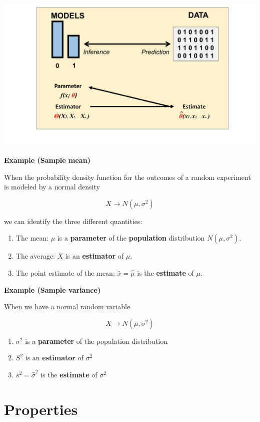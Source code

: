\documentclass[
]{book}
\providecommand{\tightlist}{%
  \setlength{\itemsep}{0pt}\setlength{\parskip}{0pt}}
\begin{document}
\includegraphics{./figures/estimator.JPG}

\textbf{Example (Sample mean)}

When the probability density function for the outcomes of a random experiment is modeled by a normal density

\[X \rightarrow N(\mu, \sigma^2)\]

we can identify the three different quantities:

\begin{enumerate}
\def\labelenumi{\arabic{enumi}.}
\tightlist
\item
  The mean: \(\mu\) is a \textbf{parameter} of the \textbf{population} distribution \(N(\mu, \sigma^2)\).
\item
  The average: \(\bar{X}\) is an \textbf{estimator} of \(\mu\).
\item
  The point estimate of the mean: \(\bar{x}=\hat{\mu}\) is the \textbf{estimate} of \(\mu\).
\end{enumerate}

\textbf{Example (Sample variance)}

When we have a normal random variable

\[X \rightarrow N(\mu, \sigma^2)\]

\begin{enumerate}
\def\labelenumi{\arabic{enumi}.}
\tightlist
\item
  \(\sigma^2\) is a \textbf{parameter} of the population distribution
\item
  \(S^2\) is an \textbf{estimator} of \(\sigma^2\)
\item
  \(s^2=\hat{\sigma}^2\) is the \textbf{estimate} of \(\sigma^2\)
\end{enumerate}

\hypertarget{properties}{%
\section{Properties}\label{properties}}
\end{document}
